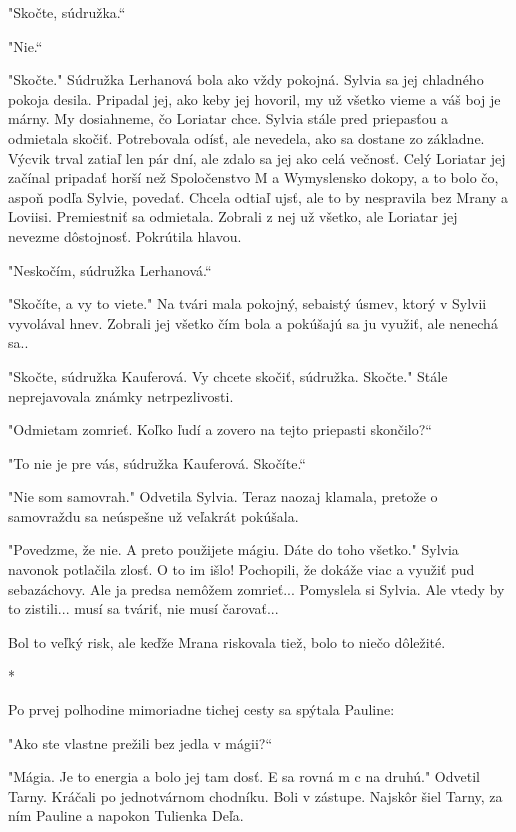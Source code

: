 \documentclass{book}
\begin{document}
"$ $Skočte, súdružka.“

"$ $Nie.“

"$ $Skočte."$ $ Súdružka Lerhanová bola ako vždy pokojná. Sylvia sa jej chladného pokoja desila. Pripadal jej, ako keby jej hovoril, my už všetko vieme a váš boj je márny. My dosiahneme, čo Loriatar chce. Sylvia stále pred priepasťou a odmietala skočiť. Potrebovala odísť, ale nevedela, ako sa dostane zo základne. Výcvik trval zatiaľ len pár dní, ale zdalo sa jej ako celá večnosť. Celý Loriatar jej začínal pripadať horší než Spoločenstvo M a Wymyslensko dokopy, a to bolo čo, aspoň podľa Sylvie, povedať. Chcela odtiaľ ujsť, ale to by nespravila bez Mrany a Loviisi. Premiestniť sa odmietala. Zobrali z nej už všetko, ale Loriatar jej nevezme dôstojnosť. Pokrútila hlavou.

"$ $Neskočím, súdružka Lerhanová.“

"$ $Skočíte, a vy to viete."$ $ Na tvári mala pokojný, sebaistý úsmev, ktorý v Sylvii vyvolával hnev. Zobrali jej všetko čím bola a pokúšajú sa ju využiť, ale nenechá sa..

"$ $Skočte, súdružka Kauferová. Vy chcete skočiť, súdružka. Skočte."$ $ Stále neprejavovala známky netrpezlivosti.

"$ $Odmietam zomrieť. Koľko ľudí a zovero na tejto priepasti skončilo?“

"$ $To nie je pre vás, súdružka Kauferová. Skočíte.“

"$ $Nie som samovrah."$ $ Odvetila Sylvia. Teraz naozaj klamala, pretože o samovraždu sa neúspešne už veľakrát pokúšala.

"$ $Povedzme, že nie. A preto použijete mágiu. Dáte do toho všetko."$ $ Sylvia navonok potlačila zlosť. O to im išlo! Pochopili, že dokáže viac a využiť pud sebazáchovy. Ale ja predsa nemôžem zomrieť... Pomyslela si Sylvia. Ale vtedy by to zistili... musí sa tváriť, nie musí čarovať...

Bol to veľký risk, ale keďže Mrana riskovala tiež, bolo to niečo dôležité.

\begin{center}
*
\end{center} 

Po prvej polhodine mimoriadne tichej cesty sa spýtala Pauline:

"$ $Ako ste vlastne prežili bez jedla v mágii?“

"$ $Mágia. Je to energia a bolo jej tam dosť. E sa rovná m c na druhú."$ $ Odvetil Tarny. Kráčali po jednotvárnom chodníku. Boli v zástupe. Najskôr šiel Tarny, za ním Pauline a napokon Tulienka Deľa.
\end{document}

